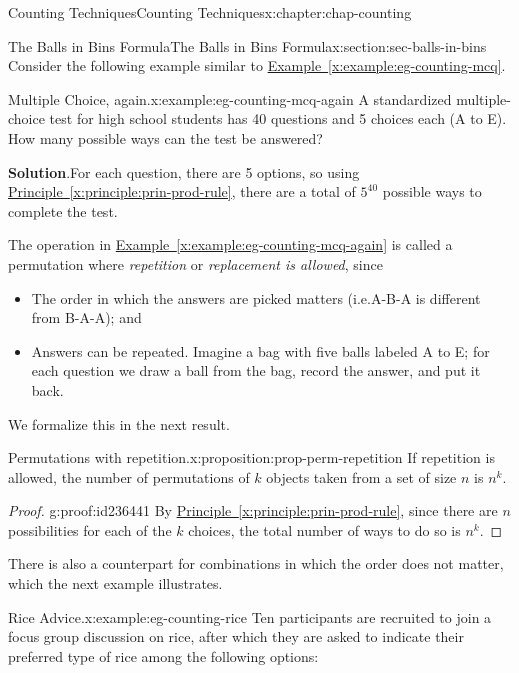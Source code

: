 \documentclass[oneside,10pt,]{book}
\newcommand{\blocktitlefont}{\relax}
\newcommand{\xreffont}{\relax}
\numberwithin{equation}{section}
\begin{document}
\begin{chapterptx}{Counting Techniques}{}{Counting Techniques}{}{}{x:chapter:chap-counting}
\begin{sectionptx}{The Balls in Bins Formula}{}{The Balls in Bins Formula}{}{}{x:section:sec-balls-in-bins}
Consider the following example similar to \hyperref[x:example:eg-counting-mcq]{Example~{\xreffont\ref{x:example:eg-counting-mcq}}}.%
\begin{example}{Multiple Choice, again.}{x:example:eg-counting-mcq-again}%
A standardized multiple-choice test for high school students has 40 questions and 5 choices each (A to E). How many possible ways can the test be answered?%
\par\smallskip%
\noindent\textbf{\blocktitlefont Solution}.\hypertarget{g:solution:id235990}{}\quad{}For each question, there are 5 options, so using \hyperref[x:principle:prin-prod-rule]{Principle~{\xreffont\ref{x:principle:prin-prod-rule}}}, there are a total of \(5^{40}\) possible ways to complete the test.%
\end{example}
The operation in \hyperref[x:example:eg-counting-mcq-again]{Example~{\xreffont\ref{x:example:eg-counting-mcq-again}}} is called a permutation where \emph{repetition} or \emph{replacement is allowed}, since%
\begin{itemize}[label=\textbullet]
\item{}The order in which the answers are picked matters (i.e.\@ A-B-A is different from B-A-A); and%
\item{}Answers can be repeated. Imagine a bag with five balls labeled A to E; for each question we draw a ball from the bag, record the answer, and put it back.%
\end{itemize}
We formalize this in the next result.%
\begin{proposition}{Permutations with repetition.}{}{x:proposition:prop-perm-repetition}%
If repetition is allowed, the number of permutations of \(k\) objects taken from a set of size \(n\) is \(n^k\).%
\end{proposition}
\begin{proof}{}{g:proof:id236441}
By \hyperref[x:principle:prin-prod-rule]{Principle~{\xreffont\ref{x:principle:prin-prod-rule}}}, since there are \(n\) possibilities for each of the \(k\) choices, the total number of ways to do so is \(n^k\).%
\end{proof}
There is also a counterpart for combinations in which the order does not matter, which the next example illustrates.%
\begin{example}{Rice Advice.}{x:example:eg-counting-rice}%
Ten participants are recruited to join a focus group discussion on rice, after which they are asked to indicate their preferred type of rice among the following options:%
\begin{itemize}[label=\textbullet]

\end{itemize}
\end{example}
\end{sectionptx}
\end{chapterptx}
\end{document}
